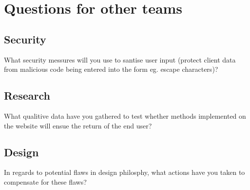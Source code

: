 \documentclass[letterpaper,12pt]{article}
\begin{document}
 \begin{bchart}[step=15,max=100,width=12cm]
 \end{bchart}

\section{Questions for other teams}

\subsection{ Security}

What security messures will you use to santise user input (protect client data from malicious code being entered into the form eg. escape characters)?

\subsection{Research}

What qualitive data have you gathered to test whether methods implemented on the website will ensue the return of the end user?

\subsection {Design}

In regards to potential flaws in design philosphy, what actions have you taken to compensate for these flaws?



\appendix
\printindex
{}
\printglossaries

\end{document}
